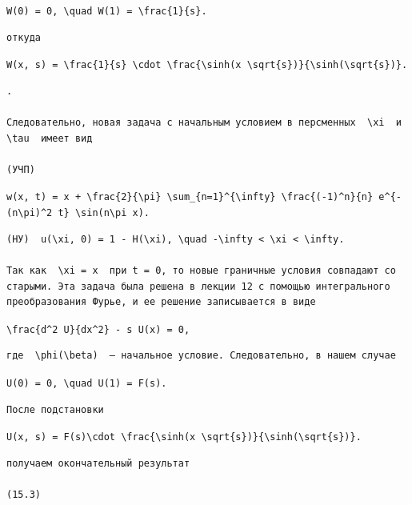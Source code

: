 \documentclass[
  ukrainian,
]{article}
\begin{document}
\texttt{W(0)\ =\ 0,\ \textbackslash{}quad\ W(1)\ =\ \textbackslash{}frac\{1\}\{s\}.}

\begin{verbatim}
откуда
\end{verbatim}

\texttt{W(x,\ s)\ =\ \textbackslash{}frac\{1\}\{s\}\ \textbackslash{}cdot\ \textbackslash{}frac\{\textbackslash{}sinh(x\ \textbackslash{}sqrt\{s\})\}\{\textbackslash{}sinh(\textbackslash{}sqrt\{s\})\}.}

\begin{verbatim}
.

Следовательно, новая задача с начальным условием в персменных  \xi  и  \tau  имеет вид

(УЧП)
\end{verbatim}

\texttt{w(x,\ t)\ =\ x\ +\ \textbackslash{}frac\{2\}\{\textbackslash{}pi\}\ \textbackslash{}sum\_\{n=1\}\^{}\{\textbackslash{}infty\}\ \textbackslash{}frac\{(-1)\^{}n\}\{n\}\ e\^{}\{-(n\textbackslash{}pi)\^{}2\ t\}\ \textbackslash{}sin(n\textbackslash{}pi\ x).}

\begin{verbatim}
(НУ)  u(\xi, 0) = 1 - H(\xi), \quad -\infty < \xi < \infty. 

Так как  \xi = x  при t = 0, то новые граничные условия совпадают со старыми. Эта задача была решена в лекции 12 с помощью интегрального преобразования Фурье, и ее решение записывается в виде
\end{verbatim}

\texttt{\textbackslash{}frac\{d\^{}2\ U\}\{dx\^{}2\}\ -\ s\ U(x)\ =\ 0,}

\begin{verbatim}
где  \phi(\beta)  — начальное условие. Следовательно, в нашем случае
\end{verbatim}

\texttt{U(0)\ =\ 0,\ \textbackslash{}quad\ U(1)\ =\ F(s).}

\begin{verbatim}
После подстановки
\end{verbatim}

\texttt{U(x,\ s)\ =\ F(s)\textbackslash{}cdot\ \textbackslash{}frac\{\textbackslash{}sinh(x\ \textbackslash{}sqrt\{s\})\}\{\textbackslash{}sinh(\textbackslash{}sqrt\{s\})\}.}

\begin{verbatim}
получаем окончательный результат

(15.3)
\end{verbatim}
\end{document}
